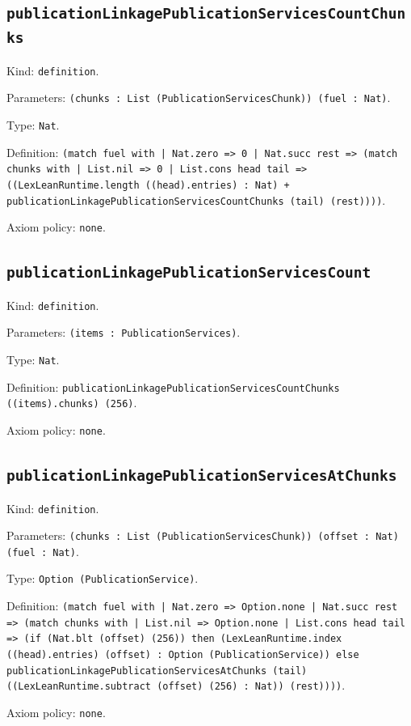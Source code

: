 \documentclass[11pt]{article}
\begin{document}
\subsection*{\texttt{publicationLinkagePublicationServicesCountChunks}}
\noindent Kind: \texttt{definition}.\par
\noindent Parameters: \texttt{(chunks : List (PublicationServicesChunk)) (fuel : Nat)}.\par
\noindent Type: \texttt{Nat}.\par
\noindent Definition: \texttt{(match fuel with | Nat.zero => 0 | Nat.succ rest => (match chunks with | List.nil => 0 | List.cons head tail => ((LexLeanRuntime.length ((head).entries) : Nat) + publicationLinkagePublicationServicesCountChunks (tail) (rest))))}.\par
\noindent Axiom policy: \texttt{none}.\par
\subsection*{\texttt{publicationLinkagePublicationServicesCount}}
\noindent Kind: \texttt{definition}.\par
\noindent Parameters: \texttt{(items : PublicationServices)}.\par
\noindent Type: \texttt{Nat}.\par
\noindent Definition: \texttt{publicationLinkagePublicationServicesCountChunks ((items).chunks) (256)}.\par
\noindent Axiom policy: \texttt{none}.\par
\subsection*{\texttt{publicationLinkagePublicationServicesAtChunks}}
\noindent Kind: \texttt{definition}.\par
\noindent Parameters: \texttt{(chunks : List (PublicationServicesChunk)) (offset : Nat) (fuel : Nat)}.\par
\noindent Type: \texttt{Option (PublicationService)}.\par
\noindent Definition: \texttt{(match fuel with | Nat.zero => Option.none | Nat.succ rest => (match chunks with | List.nil => Option.none | List.cons head tail => (if (Nat.blt (offset) (256)) then (LexLeanRuntime.index ((head).entries) (offset) : Option (PublicationService)) else publicationLinkagePublicationServicesAtChunks (tail) ((LexLeanRuntime.subtract (offset) (256) : Nat)) (rest))))}.\par
\noindent Axiom policy: \texttt{none}.\par
\end{document}
